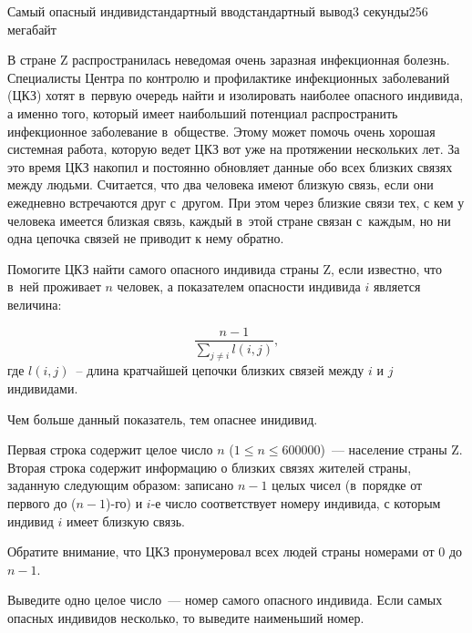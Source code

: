 \begin{problem}{Самый опасный индивид}{стандартный ввод}{стандартный вывод}{3 секунды}{256 мегабайт}

В стране Z распространилась неведомая очень заразная инфекционная болезнь. Специалисты Центра по контролю и профилактике инфекционных заболеваний (ЦКЗ) хотят в~первую очередь найти и изолировать наиболее опасного индивида, а именно того, который имеет наибольший потенциал распространить инфекционное заболевание в~обществе. Этому может помочь очень хорошая системная работа, которую ведет ЦКЗ вот уже на протяжении нескольких лет. За это время ЦКЗ накопил и постоянно обновляет данные обо всех близких связях между людьми. Считается, что два человека имеют близкую связь, если они ежедневно встречаются друг с~другом. При этом через близкие связи тех, с кем у человека имеется близкая связь, каждый в~этой стране связан с~каждым, но ни одна цепочка связей не приводит к нему обратно. 

Помогите ЦКЗ найти самого опасного индивида страны Z, если известно, что в~ней проживает $n$ человек, а показателем опасности индивида $i$ является величина: 

$$ \displaystyle\frac{n-1}{\sum_{j \neq i} l(i,j)}  ,$$
где $l(i,j)$~-- длина кратчайшей цепочки близких связей между $i$ и $j$ индивидами.
 
Чем больше данный показатель, тем опаснее инидивид.  

\InputFile
Первая строка содержит целое число $n$ ($1 \leq n \leq 600 000$)~--- население страны Z. Вторая строка содержит информацию о близких связях жителей страны, заданную следующим образом: записано $n-1$ целых чисел (в~порядке от первого до ($n-1$)-го) и $i$-е число соответствует номеру индивида, с которым индивид $i$ имеет близкую связь. 

Обратите внимание, что ЦКЗ пронумеровал всех людей страны номерами от $0$ до $n-1$.  

\OutputFile
Выведите одно целое число~--- номер самого опасного индивида.  Если самых опасных индивидов несколько, то выведите наименьший номер.

\Examples

\begin{example}
%
%
\end{example}

\end{problem}

